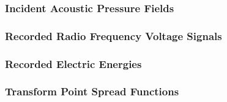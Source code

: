 \subsubsection{Incident Acoustic Pressure Fields}


\subsubsection{Recorded Radio Frequency Voltage Signals}


\subsubsection{Recorded Electric Energies}


\subsubsection{Transform Point Spread Functions}


